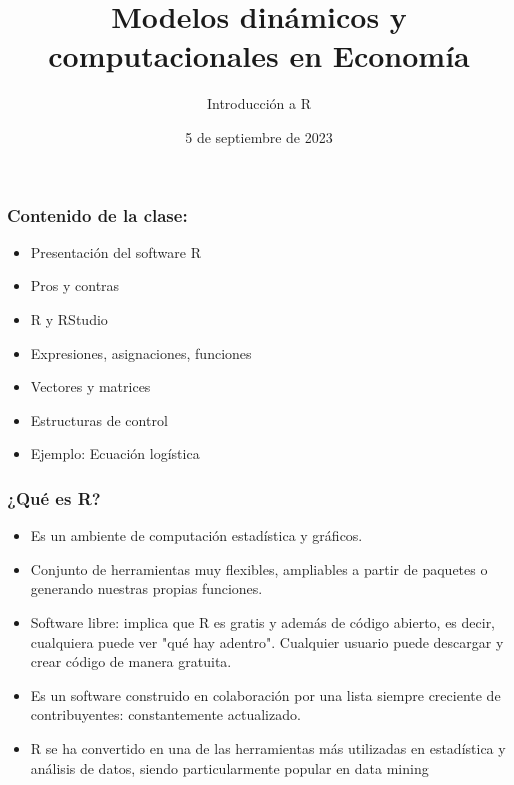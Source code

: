 \documentclass[11pt]{beamer}
\begin{document}
	\title{Modelos dinámicos y computacionales en Economía}
	\subtitle{Introducción a R}
	\date{5 de septiembre de 2023}
	\frame[plain]{\maketitle}

\begin{frame}
\frametitle{Contenido de la clase:}
\begin{itemize}
	\item Presentación del software R
	\item Pros y contras
	\item R y RStudio
	\item Expresiones, asignaciones, funciones
	\item Vectores y matrices
	\item Estructuras de control
	\item Ejemplo: Ecuación logística	
\end{itemize}
\end{frame}

\begin{frame}
\frametitle{¿Qué es R?}
\begin{itemize}
	\item Es un ambiente de computación estadística y gráficos.
	\item Conjunto de herramientas muy flexibles, ampliables a partir de paquetes o generando nuestras propias funciones.
	\item Software libre: implica que R es gratis y además de código abierto, es decir, cualquiera puede ver "qué hay adentro". Cualquier usuario puede descargar y crear código de manera gratuita.
	\item Es un software construido en colaboración por una lista siempre creciente de contribuyentes: constantemente actualizado.
	\item R se ha convertido en una de las herramientas más utilizadas en estadística y análisis de datos, siendo particularmente popular en 
	data mining
\end{itemize}
\end{frame}
\end{document}

